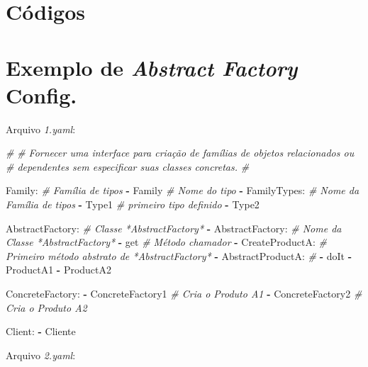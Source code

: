\documentclass[]{article}
\author{}
\date{}
\newenvironment{Shaded}{}{}
\newcommand{\KeywordTok}[1]{\textcolor[rgb]{0.00,0.44,0.13}{\textbf{{#1}}}}
\newcommand{\CommentTok}[1]{\textcolor[rgb]{0.38,0.63,0.69}{\textit{{#1}}}}
\newcommand{\FunctionTok}[1]{\textcolor[rgb]{0.02,0.16,0.49}{{#1}}}
\newcommand{\NormalTok}[1]{{#1}}
\begin{document}
\section{Códigos}

\section{Exemplo de \emph{Abstract Factory} Config.}

Arquivo \emph{1.yaml}:

\begin{Shaded}
\begin{Highlighting}[]
\CommentTok{#}
\CommentTok{# Fornecer uma interface para criação de famílias de objetos relacionados ou}
\CommentTok{# dependentes sem especificar suas classes concretas.}
\CommentTok{#}

\FunctionTok{Family:}                     \CommentTok{# Família de tipos}
\KeywordTok{-} \NormalTok{Family                    }\CommentTok{# Nome do tipo}
\KeywordTok{-} \FunctionTok{FamilyTypes:}              \CommentTok{# Nome da Família de tipos}
    \KeywordTok{-} \NormalTok{Type1                 }\CommentTok{# primeiro tipo definido}
    \KeywordTok{-} \NormalTok{Type2}

\FunctionTok{AbstractFactory:}            \CommentTok{# Classe *AbstractFactory*}
\KeywordTok{-} \FunctionTok{AbstractFactory:}          \CommentTok{# Nome da Classe *AbstractFactory*}
    \KeywordTok{-} \NormalTok{get                   }\CommentTok{# Método chamador}
    \KeywordTok{-} \FunctionTok{CreateProductA:}       \CommentTok{# Primeiro método abstrato de *AbstractFactory*}
        \KeywordTok{-} \FunctionTok{AbstractProductA:} \CommentTok{# }
            \KeywordTok{-} \NormalTok{doIt}
            \KeywordTok{-} \NormalTok{ProductA1}
            \KeywordTok{-} \NormalTok{ProductA2}

\FunctionTok{ConcreteFactory:}
\KeywordTok{-} \NormalTok{ConcreteFactory1          }\CommentTok{# Cria o Produto A1}
\KeywordTok{-} \NormalTok{ConcreteFactory2          }\CommentTok{# Cria o Produto A2}

\FunctionTok{Client:}
\KeywordTok{-} \NormalTok{Cliente}
\end{Highlighting}
\end{Shaded}

\clearpage
Arquivo \emph{2.yaml}:
\end{document}
